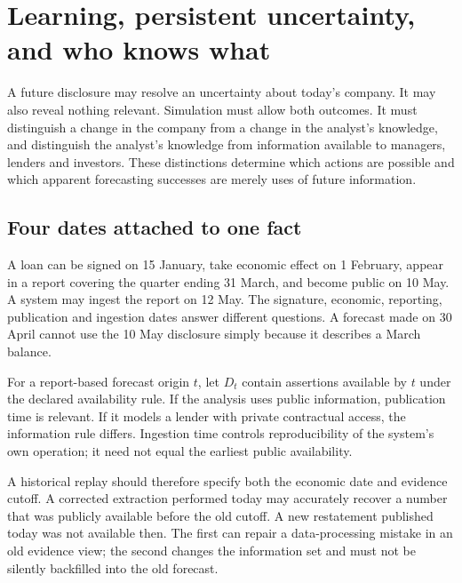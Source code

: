 \chapter[Learning and persistent uncertainty]{Learning, persistent uncertainty, and who knows what}
\label{sim:learning}

A future disclosure may resolve an uncertainty about today's company. It may also reveal nothing relevant. Simulation must allow both outcomes. It must distinguish a change in the company from a change in the analyst's knowledge, and distinguish the analyst's knowledge from information available to managers, lenders and investors. These distinctions determine which actions are possible and which apparent forecasting successes are merely uses of future information.

\section{Four dates attached to one fact}
A loan can be signed on 15 January, take economic effect on 1 February, appear in a report covering the quarter ending 31 March, and become public on 10 May. A system may ingest the report on 12 May. The signature, economic, reporting, publication and ingestion dates answer different questions. A forecast made on 30 April cannot use the 10 May disclosure simply because it describes a March balance.

For a report-based forecast origin $t$, let $D_t$ contain assertions available by $t$ under the declared availability rule. If the analysis uses public information, publication time is relevant. If it models a lender with private contractual access, the information rule differs. Ingestion time controls reproducibility of the system's own operation; it need not equal the earliest public availability.

A historical replay should therefore specify both the economic date and evidence cutoff. A corrected extraction performed today may accurately recover a number that was publicly available before the old cutoff. A new restatement published today was not available then. The first can repair a data-processing mistake in an old evidence view; the second changes the information set and must not be silently backfilled into the old forecast.

